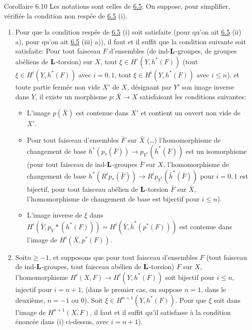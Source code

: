 \documentclass[10pt]{../fichiers-configuration-latex/smfart}
\begin{document}
\begin{enonce*}{Corollaire 6.10}
Les notations sont celles de \hyperref[XII.prop6.5]{6.5}. On suppose, pour simplifier,
vérifiée la condition non respée de {\rm \hyperref[XII.prop6.5]{6.5} (i)}.
\begin{enumerate}
\renewcommand{\theenumi}{\roman{enumi}}
\renewcommand{\labelenumi}{(\theenumi)}
\item Pour que la condition respée de {\rm \hyperref[XII.prop6.5]{6.5} (i)} soit satisfaite
(\resp pour qu'on ait {\rm \hyperref[XII.prop6.5]{6.5} (ii) a),} \resp pour qu'on ait {\rm \hyperref[XII.prop6.5]{6.5}
(iii) a))}, il faut et il suffit que la condition suivante soit
satisfaite: Pour tout faisceau $F$ d'ensembles (\resp de
ind-$\mathbf{L}$-groupes, \resp de groupes abéliens de
$\mathbf{L}$-torsion) sur $X$, tout $\xi\in H^{\circ}(Y,h^{\ast}(F))$
(\resp tout $\xi\in H^{i}(Y,h^{\ast}(F))$ avec $i=0,1$, \resp tout
$\xi \in H^{i}(Y,h^{\ast}(F))$ avec $i\leq n$), et toute partie fermée
non vide $X'$ de $X$, désignant par $Y'$ son image inverse dans $Y$,
il existe un morphisme $p:\bar{X}\rightarrow X$ satisfaisant les
conditions suivantes:
\begin{itemize}
\item[$1^{\circ}$)] L'image $p(\bar{X})$ est contenue dans $X'$ et
contient un ouvert non vide de $X'$.

\item[$2^{\circ}$)] Pour tout faisceau d'ensembles $\bar{F}$ sur
$\bar{X}$ (\resp\ldots) l'homomorphisme de changement de base
$h^{\ast}(p_{\ast}(\bar{F}))\rightarrow p_{Y^{\ast}}(\bar{h}^{\ast}(\bar{F}))$ 
est un isomorphisme (\resp pour
tout faisceau de ind-$\mathbf{L}$-groupes $\bar{F}$ sur $X$,
l'homomorphisme de changement de base
$h^{\ast}(R^{i}p_{\ast}(\bar{F}))\rightarrow
R^{i}p_{Y^{\ast}}(\bar{h}^{\ast}(\bar{F}))$ pour $i=0,1$ est bijectif,
\resp pour tout faisceau abélien de $\mathbf{L}$-torsion $\bar{F}$ sur
$\bar{X}$, l'homomorphisme de changement de base est bijectif pour
$i\leq n$).

\item[$3^{\circ}$)] L'image inverse de $\xi$ dans
$H^{i}(\bar{Y},p_Y\ast(h^{\ast}(F)))=H^{i}(\bar{Y},
\bar{h}^{\ast}(p^{\ast}(F)))$ est contenue dans l'image de
$H^{i}(\bar{X},p^{\ast}(F))$.
\end{itemize}

\item Soit\pageoriginale $n\geq -1$, et supposons que pour tout
faisceau d'ensembles $F$ (\resp tout faisceau de
ind-$\mathbf{L}$-groupes, \resp tout faisceau abélien de
$\mathbf{L}$-torsion) $F$ sur $X$, l'homomorphisme
$H^{i}(X,F)\rightarrow H^{i}(Y,h^{\ast}(F))$ soit bijectif pour $i\leq
n$, injectif pour $i=n+1$, (dans le premier cas, on suppose $n=1$,
dans le deuxième, $n=-1$ ou $0$). Soit $\xi \in
H^{n+1}(Y,h^{\ast}(F))$. Pour que $\xi$ soit dans l'image de
$H^{n+1}(X,F)$, il faut et il suffit qu'il satisfasse à la condition
énoncée dans {\rm(i)} ci-dessus, avec $i=n+1$).
\end{enumerate}
\end{enonce*}
\end{document}
